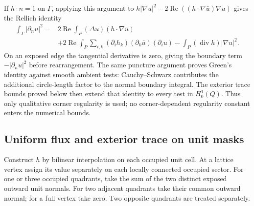 \documentclass[11pt,reqno]{amsart}
\numberwithin{equation}{section}
\begin{document}
If $h\cdot n=1$ on $\Gamma$, applying this argument to
$h|\nabla u|^2-2\operatorname{Re}((h\cdot\nabla\bar u)\nabla u)$
gives the Rellich identity
\begin{equation}\label{cert:rellich}
\begin{split}
 \int_\Gamma|\partial_nu|^2
 ={}&2\operatorname{Re}\int_P(\Delta u)
                                      (h\cdot\nabla\bar u)\\
 &+2\operatorname{Re}\int_P
        \sum_{i,k}(\partial_i h_k)(\partial_k\bar u)(\partial_i u)
       -\int_P(\operatorname{div}h)|\nabla u|^2 .
\end{split}
\end{equation}
On an exposed edge the tangential derivative is zero, giving
the boundary term $-|\partial_nu|^2$ before rearrangement.
The same puncture argument proves Green's identity against
smooth ambient tests: Cauchy--Schwarz contributes the additional
circle-length factor to the normal boundary integral.
The exterior trace bounds proved below then extend that identity
to every test in $H^1_0(Q)$.  Thus only qualitative corner
regularity is used; no corner-dependent regularity constant
enters the numerical bounds.

\subsection{Uniform flux and exterior trace on unit masks}
\label{cert:square-geometry}

Construct $h$ by bilinear interpolation on each occupied unit
cell.  At a lattice vertex assign its value separately on each
locally connected occupied sector.  For one or three occupied
quadrants, take the sum of the two distinct exposed outward unit
normals.  For two adjacent quadrants take their common outward
normal; for a full vertex take zero.  Two opposite quadrants
are treated separately.
\end{document}
